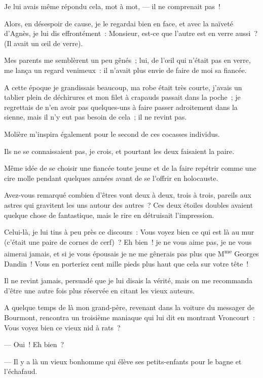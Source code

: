 \documentclass[french,twoside]{book} %
\begin{document}
\noindent Je lui avais même répondu cela, mot à mot, — il ne comprenait pas !\par
 Alors, en désespoir de cause, je le regardai bien en face, et avec la naïveté d’Agnès, je lui dis effrontément : Monsieur, est-ce que l’autre est en verre aussi ? (Il avait un œil de verre).\par
Mes parents me semblèrent un peu gênés ; lui, de l’œil qui n’était pas en verre, me lança un regard venimeux : il n’avait plus envie de faire de moi sa fiancée.\par
A cette époque je grandissais beaucoup, ma robe était très courte, j’avais un tablier plein de déchirures et mon filet à crapauds passait dans la poche ; je regrettais de n’en avoir pas quelques-uns à faire passer adroitement dans la sienne, mais il n’y eut pas besoin de cela ; il ne revint pas.\par
Molière m’inspira également pour le second de ces cocasses individus.\par
Ils ne se connaissaient pas, je crois, et pourtant les deux faisaient la paire.\par
Même idée de se choisir une fiancée toute jeune et de la faire repétrir comme une cire molle pendant quelques années avant de se l’offrir en holocauste.\par
Avez-vous remarqué combien d’êtres vont deux à deux, trois à trois, pareils aux astres qui gravitent les uns autour des autres ? Ces deux étoiles doubles avaient quelque chose de fantastique,  mais le rire en détruisait l’impression.\par
Celui-là, je lui tins à peu près ce discours : Vous voyez bien ce qui est là au mur (c’était une paire de cornes de cerf) ? Eh bien ! je ne vous aime pas, je ne vous aimerai jamais, et si je vous épousais je ne me gênerais pas plus que M\textsuperscript{me} Georges Dandin ! Vous en porteriez cent mille pieds plus haut que cela sur votre tête !\par
Il ne revint jamais, persuadé que je lui disais la vérité, mais on me recommanda d’être une autre fois plus réservée en citant les vieux auteurs.\par
A quelque temps de là mon grand-père, revenant dans la voiture du messager de Bourmont, rencontra un troisième maniaque qui lui dit en montrant Vroncourt : Vous voyez bien ce vieux nid à rats ?\par
— Oui ! Eh bien ?\par
— Il y a là un vieux bonhomme qui élève ses petits-enfants pour le bagne et l’échafaud.\par
\end{document}
